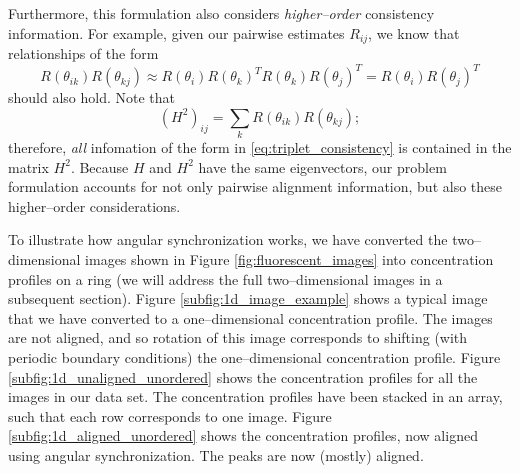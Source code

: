 \documentclass[11pt]{article}
\begin{document}
Furthermore, this formulation also considers {\em higher--order} consistency information. 
%
For example, given our pairwise estimates $R_{ij}$, we know that relationships of the form
\begin{equation} \label{eq:triplet_consistency}
R(\theta_{ik}) R(\theta_{kj}) \approx R(\theta_i) R(\theta_k)^T R(\theta_k) R(\theta_j)^T = R(\theta_i) R(\theta_j)^T
\end{equation}
should also hold.
%
Note that
\begin{equation}
(H^2)_{ij} = \sum_k R(\theta_{ik}) R(\theta_{kj});
\end{equation}
therefore, {\em all} infomation of the form in \eqref{eq:triplet_consistency} is contained in the matrix $H^2$.
%
Because $H$ and $H^2$ have the same eigenvectors, our problem formulation accounts for not only pairwise alignment information, but also these higher--order considerations. 

To illustrate how angular synchronization works, we have converted the two--dimensional images shown in Figure \ref{fig:fluorescent_images} into concentration profiles on a ring (we will address the full two--dimensional images in a subsequent section). 
%
Figure \ref{subfig:1d_image_example} shows a typical image that we have converted to a one--dimensional concentration profile. 
%
The images are not aligned, and so rotation of this image corresponds to shifting (with periodic boundary conditions) the one--dimensional concentration profile. 
%
Figure \ref{subfig:1d_unaligned_unordered} shows the concentration profiles for all the images in our data set. 
%
The concentration profiles have been stacked in an array, such that each row corresponds to one image.
%
Figure \ref{subfig:1d_aligned_unordered} shows the concentration profiles, now aligned using angular synchronization. 
%
The peaks are now (mostly) aligned.
\end{document}
